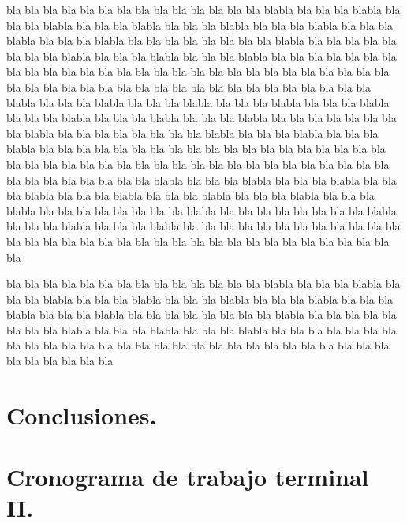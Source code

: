 \documentclass[11pt,letter]{report}
\begin{document}
bla bla bla bla bla bla bla bla bla bla bla bla bla bla blabla bla bla bla blabla bla bla bla blabla bla bla bla blabla bla bla bla blabla bla bla bla blabla bla bla bla blabla bla bla bla blabla bla bla bla bla bla bla bla bla blabla bla bla bla bla bla bla bla bla blabla bla bla bla blabla bla bla bla blabla bla bla bla bla bla bla bla bla bla bla bla bla bla bla bla bla bla bla bla bla bla bla bla bla bla bla bla bla bla bla bla bla bla bla
bla bla bla bla bla bla bla bla bla bla bla bla bla bla blabla bla bla bla blabla bla bla bla blabla bla bla bla blabla bla bla bla blabla bla bla bla blabla bla bla bla blabla bla bla bla blabla bla bla bla bla bla bla bla bla blabla bla bla bla bla bla bla bla bla blabla bla bla bla blabla bla bla bla blabla bla bla bla bla bla bla bla bla bla bla bla bla bla bla bla bla bla bla bla bla bla bla bla bla bla bla bla bla bla bla bla bla bla bla
bla bla bla bla bla bla bla bla bla bla bla bla bla bla blabla bla bla bla blabla bla bla bla blabla bla bla bla blabla bla bla bla blabla bla bla bla blabla bla bla bla blabla bla bla bla blabla bla bla bla bla bla bla bla bla blabla bla bla bla bla bla bla bla bla blabla bla bla bla blabla bla bla bla blabla bla bla bla bla bla bla bla bla bla bla bla bla bla bla bla bla bla bla bla bla bla bla bla bla bla bla bla bla bla bla bla bla bla bla


bla bla bla bla bla bla bla bla bla bla bla bla bla bla blabla bla bla bla blabla bla bla bla blabla bla bla bla blabla bla bla bla blabla bla bla bla blabla bla bla bla blabla bla bla bla blabla bla bla bla bla bla bla bla bla blabla bla bla bla bla bla bla bla bla blabla bla bla bla blabla bla bla bla blabla bla bla bla bla bla bla bla bla bla bla bla bla bla bla bla bla bla bla bla bla bla bla bla bla bla bla bla bla bla bla bla bla bla bla


\section{Conclusiones.}

\section{Cronograma de trabajo terminal II.}



 
 
\end{document}
